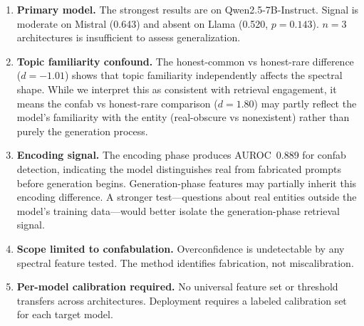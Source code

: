 \documentclass[11pt,a4paper]{article}
\begin{document}
\begin{enumerate}
\item \textbf{Primary model.} The strongest results are on
  Qwen2.5-7B-Instruct. Signal is moderate on Mistral (0.643) and
  absent on Llama (0.520, $p = 0.143$). $n=3$ architectures is insufficient to
  assess generalization.


\item \textbf{Topic familiarity confound.} The honest-common vs
  honest-rare difference ($d = -1.01$) shows that topic familiarity
  independently affects the spectral shape. While we interpret this as
  consistent with retrieval engagement, it means the confab vs
  honest-rare comparison ($d = 1.80$) may partly reflect the model's
  familiarity with the entity (real-obscure vs nonexistent) rather
  than purely the generation process.

\item \textbf{Encoding signal.} The encoding phase produces
  AUROC~0.889 for confab detection, indicating the model distinguishes
  real from fabricated prompts before generation begins.
  Generation-phase features may partially inherit this encoding
  difference. A stronger test---questions about real entities outside
  the model's training data---would better isolate the generation-phase
  retrieval signal.

\item \textbf{Scope limited to confabulation.} Overconfidence is
  undetectable by any spectral feature tested. The method identifies
  fabrication, not miscalibration.

\item \textbf{Per-model calibration required.} No universal feature
  set or threshold transfers across architectures. Deployment requires
  a labeled calibration set for each target model.



\end{enumerate}
\end{document}
